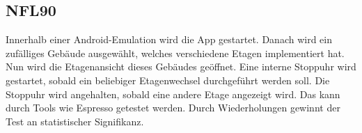 \subsection*{NFL90}

Innerhalb einer Android-Emulation wird die App gestartet.
Danach wird ein zufälliges Gebäude ausgewählt, welches verschiedene Etagen implementiert hat.
Nun wird die Etagenansicht dieses Gebäudes geöffnet.
Eine interne Stoppuhr wird gestartet, sobald ein beliebiger Etagenwechsel durchgeführt werden soll.
Die Stoppuhr wird angehalten, sobald eine andere Etage angezeigt wird.
Das kann durch Tools wie Espresso getestet werden.
Durch Wiederholungen gewinnt der Test an statistischer Signifikanz.